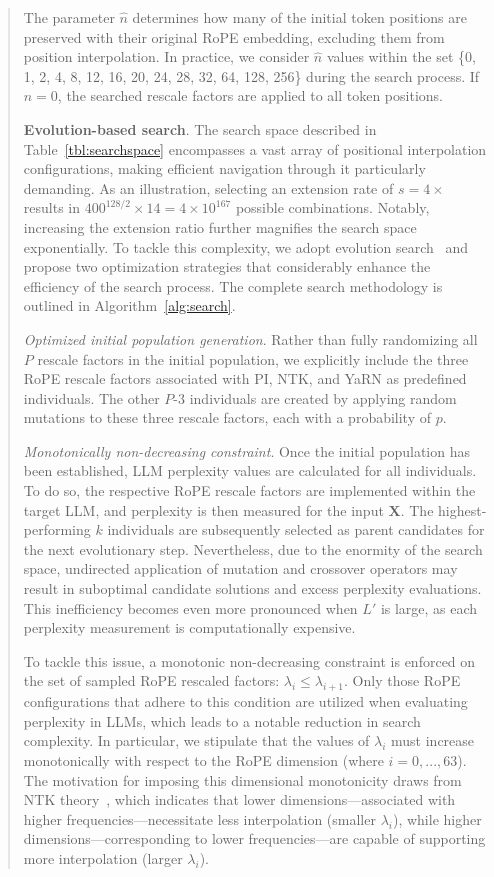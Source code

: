 \begin{abstract}
The parameter $\hat{n}$ determines how many of the initial token positions are preserved with their original RoPE embedding, excluding them from position interpolation. In practice, we consider $\hat{n}$ values within the set \{0, 1, 2, 4, 8, 12, 16, 20, 24, 28, 32, 64, 128, 256\} during the search process. If $\hat{n}=0$, the searched rescale factors are applied to all token positions.

\textbf{Evolution-based search}. The search space described in Table~\ref{tbl:searchspace} encompasses a vast array of positional interpolation configurations, making efficient navigation through it particularly demanding. As an illustration, selecting an extension rate of $s=4\times$ results in $400^{128/2}\times14=4\times10^{167}$ possible combinations. Notably, increasing the extension ratio further magnifies the search space exponentially. To tackle this complexity, we adopt evolution search~\cite{guo2020single} and propose two optimization strategies that considerably enhance the efficiency of the search process. The complete search methodology is outlined in Algorithm~\ref{alg:search}.

\textit{Optimized initial population generation}. Rather than fully randomizing all $P$ rescale factors in the initial population, we explicitly include the three RoPE rescale factors associated with PI, NTK, and YaRN as predefined individuals. The other $P$-3 individuals are created by applying random mutations to these three rescale factors, each with a probability of $p$.

\textit{Monotonically non-decreasing constraint}. Once the initial population has been established, LLM perplexity values are calculated for all individuals. To do so, the respective RoPE rescale factors are implemented within the target LLM, and perplexity is then measured for the input $\mathbf{X}$. The highest-performing $k$ individuals are subsequently selected as parent candidates for the next evolutionary step. Nevertheless, due to the enormity of the search space, undirected application of mutation and crossover operators may result in suboptimal candidate solutions and excess perplexity evaluations. This inefficiency becomes even more pronounced when $L'$ is large, as each perplexity measurement is computationally expensive.

To tackle this issue, a monotonic non-decreasing constraint is enforced on the set of sampled RoPE rescaled factors: $\lambda_i \leq \lambda_{i+1}$. Only those RoPE configurations that adhere to this condition are utilized when evaluating perplexity in LLMs, which leads to a notable reduction in search complexity. In particular, we stipulate that the values of $\lambda_i$ must increase monotonically with respect to the RoPE dimension (where $i=0,...,63$). The motivation for imposing this dimensional monotonicity draws from NTK theory~\cite{jacot2018neural,tancik2020fourier,ntk}, which indicates that lower dimensions—associated with higher frequencies—necessitate less interpolation (smaller $\lambda_i$), while higher dimensions—corresponding to lower frequencies—are capable of supporting more interpolation (larger $\lambda_i$).


\end{abstract}
